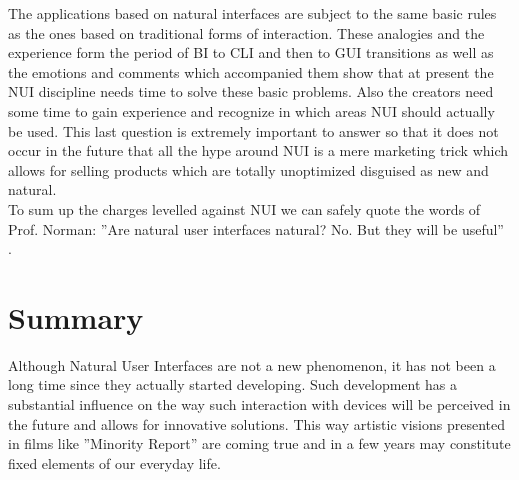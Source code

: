\documentclass{jacsart}
\begin{document}
\indent The applications based on natural interfaces are subject to the same basic rules as the ones based on traditional forms of interaction. These analogies and the experience form the period of BI to CLI and then to GUI transitions as well as the emotions and comments which accompanied them show that at present the NUI discipline needs time to solve these basic problems. Also the creators need some time to gain experience and recognize in which areas NUI should actually be used.  This last question is extremely important to answer so that it does not occur in the future that all the hype around NUI is a mere marketing trick which allows for selling products which are totally unoptimized disguised as new and natural.\\
\indent To sum up the charges levelled against NUI we can safely quote the words of Prof. Norman: ''Are natural user interfaces natural? No. But they will be useful'' \cite{Norman2010}.\\

\section{Summary} \label{sec:summary}

\indent Although Natural User Interfaces are not a new phenomenon, it has not been a long time since they actually started developing. Such development has a substantial influence on the way such interaction with devices will be perceived in the future and allows for innovative solutions. This way artistic visions presented in films like ''Minority Report'' are coming true and in a few years may constitute fixed elements of our everyday life.




\end{document}
